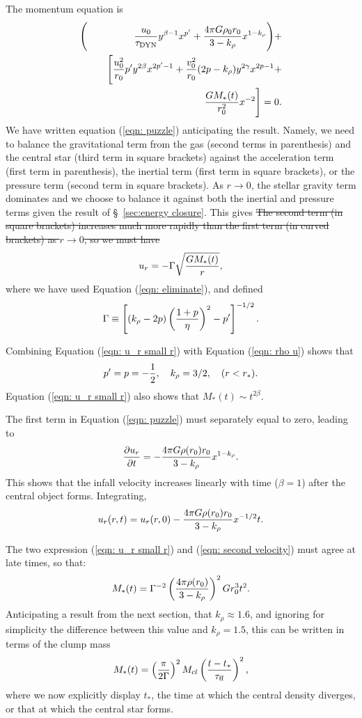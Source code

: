 \documentclass[iop,apj,numberedappendix]{emulateapj}
\newcommand       \phil[1]      {{\color{blue} #1}}
\newcommand       \be		{\begin{equation}}
\newcommand       \ee		{\end{equation}}
\newcommand       \bea          {\begin{eqnarray}}
\newcommand       \eea          {\end{eqnarray}}
\newcommand       \etaeff       {\eta}
\newcommand       \tff          {\tau_{\rm ff}}
\newcommand       \tDyn         {\tau_{\rm DYN}}
\begin{document}
The momentum equation is
%
\bea  \label{eqn: puzzle}%
&\Bigg(&{u_0\over \tDyn}y^{\beta-1}x^{p'}+{4\pi G\rho_0r_0\over
  3-k_\rho}
x^{1-k_\rho}\Bigg)+\nonumber\\
&&\quad\Bigg[
{u_0^2\over r_0}p'y^{2\beta}x^{2p'-1}+{v_0^2\over
  r_0}(2p-k_\rho)y^{2\gamma}x^{2p-1}+\nonumber\\
&&\quad{GM_*(t)\over r_0^2}x^{-2}
\Bigg]
=0.
\eea  %
%
\phil{We have written equation (\ref{eqn: puzzle}) anticipating the
  result.  Namely, we need to balance the gravitational term from the
  gas (second terms in parenthesis) and the central star (third term
  in square brackets) against the acceleration term (first term in
  parenthesis), the inertial term (first term in square brackets), or
  the pressure term (second term in square brackets). As $r\to 0$, the
  stellar gravity term dominates and we choose to balance it against
  both the inertial and pressure terms given the result of
  \S~\ref{sec:energy closure}. This gives
\sout{The second term (in square brackets) increases much more
rapidly than the first term (in curved brackets) as $r\to 0$, so we must have}}
%
\be \label{eqn: u_r small r}%
u_r=-\Gamma
\sqrt{GM_*(t)\over r},
\ee %
%
where we have used Equation (\ref{eqn: eliminate}), and defined
%
\be \label{eqn: Gamma}%
\Gamma\equiv\left[(k_\rho-2p)\left({1+p\over\etaeff}\right)^2-p'\right]^{-1/2}.
\ee %
%

Combining Equation (\ref{eqn: u_r small r})
with Equation (\ref{eqn: rho u}) shows that 
%
\be \label{eqn: vanishing r predictions} %
p'=p=-{1\over2},\quad k_\rho={3/2},\quad (r<r_*).
\ee %
%
Equation (\ref{eqn: u_r small r}) also shows that $M_*(t)\sim
t^{2\beta}$.

The first term in Equation (\ref{eqn: puzzle}) must separately equal to
zero, leading to
%
\be %
{\partial u_r\over \partial t}=-{4\pi G \rho(r_0)r_0\over 3-k_\rho}x^{1-k_\rho}.
\ee %
%
This shows that the infall velocity increases linearly with time
($\beta=1$) after
the central object forms. Integrating,
%
\be \label{eqn: second velocity}%
u_r(r,t)=u_r(r,0)-{4\pi G \rho(r_0)r_0\over 3-k_\rho}x^{-1/2}t.
\ee %
%

The two expression (\ref{eqn: u_r small r}) and (\ref{eqn: second
  velocity}) must agree at late times, so that:
%
\be %
M_*(t)=\Gamma^{-2}
\left({4\pi\rho(r_0)\over 3-k_\rho}\right)^2Gr_0^3 t^2.
\ee %
%
Anticipating a result from the next section, that $k_\rho\approx1.6$,
and ignoring for simplicity the difference between this value and
$k_\rho=1.5$, this can be written in terms of the clump mass
%
\be \label{eqn: mass vs time}%
M_*(t)=\left({\pi\over 2\Gamma}\right)^2
M_{cl}\left({t-t_*\over\tff}\right)^2,
\ee %
%
where we now explicitly display $t_*$, the time at which the central density diverges, or that
at which the central star forms.
\end{document}
